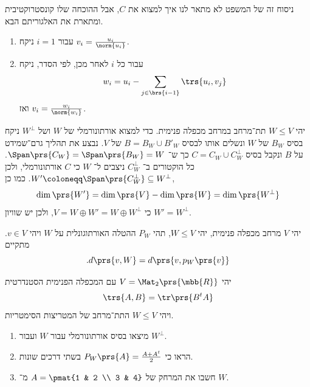 \documentclass[a4paper,10pt,twoside,openany]{book}
\begin{document}
ניסוח זה של המשפט לא מתאר לנו איך למצוא את
$C$,
אבל ההוכחה שלו קונסטרוקטיבית ומתארת את האלגוריתם הבא.

\begin{enumerate}
\item
עבור
$i = 1$
ניקח
$v_i = \frac{u_i}{\norm{u_i}}$.

\item
עבור כל
$i$
לאחר מכן, לפי הסדר, ניקח
\[w_i = u_i - \sum_{j \in \brs{i-1}} \trs{u_i, v_j}\]
ואז
$v_i = \frac{w_i}{\norm{w_i}}$.
\end{enumerate}

\begin{corollary}
יהי
$W \leq V$
תת־מרחב במרחב מכפלה פנימית.
כדי למצוא אורתונורמלי של
$W$
ושל
$W^\perp$
ניקח בסיס
$B_W$
של
$W$
ונשלים אותו לבסיס
$B = B_W \cup B'_W$
של
$V$.
נבצע את תהליך גרם־שמידט על
$B$
ונקבל בסיס
$C = C_W \cup C_W^\perp$
כך ש־%
$\Span\prs{C_W} = \Span\prs{B_W} = W$.
כל הוקטורים ב־%
$C_W^\perp$
ניצבים ל־%
$W$
כי
$C$
אורתונורמלי, ולכן
$W' \coloneqq \Span\prs{C_W^\perp} \subseteq W^\perp$.
כמו כן,
\[\dim\prs{W'} = \dim\prs{V} - \dim\prs{W} = \dim\prs{W^\perp}\]
כי
$V = W \oplus W' = W \oplus W^\perp$,
ולכן יש שוויון
$W' = W^\perp$.
\end{corollary}

\begin{theorem}
יהי
$V$
מרחב מכפלה פנימית, יהי
$W \leq V$,
תהי
$P_W$
ההטלה האורתוגונלית על
$W$
ויהי
$v \in V$.
מתקיים
\[\text{.} d\prs{v,W} = d\prs{v, p_W\prs{v}}\]
\end{theorem}

\begin{exercisechap}
יהי
$V = \Mat_2\prs{\mbb{R}}$
עם המכפלה הפנימית הסטנדרטית
\[\trs{A,B} = \tr\prs{B^t A}\]
ויהי
$W \leq V$
התת־מרחב של המטריצות הסימטריות.

\begin{enumerate}
\item מיצאו בסיס אורתונורמלי עבור
$W$
ועבור
$W^\perp$.

\item
הראו כי
$P_W\prs{A} = \frac{A + A^t}{2}$
בשתי דרכים שונות.

\item
חשבו את המרחק של
$A = \pmat{1 & 2 \\ 3 & 4}$
מ־%
$W$.
\end{enumerate}
\end{exercisechap}
\end{document}
